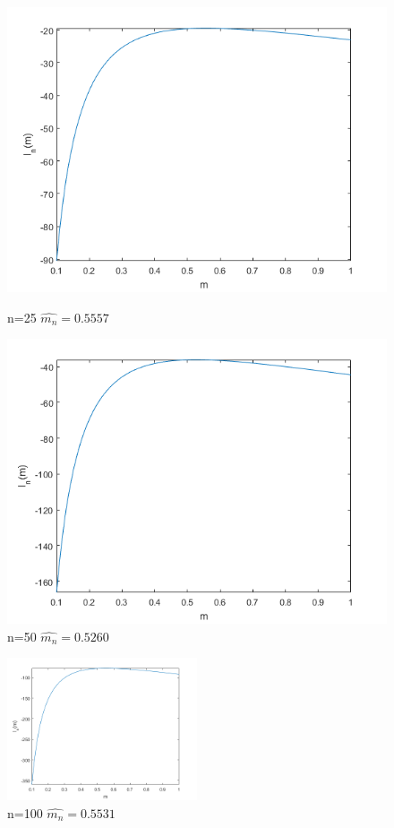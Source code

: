 \documentclass[10pt,a4paper]{report}
\begin{document}
\begin{figure}[ht]
\begin{minipage}[b]{0.5\linewidth}
\centering
\includegraphics[width=\textwidth]{q3n25.png}
\caption{n=25 $\hat{m_n}=0.5557$}
\end{minipage}
\hspace{0.5cm}
\begin{minipage}[b]{0.5\linewidth}
\centering
\includegraphics[width=\textwidth]{q3n50.png}
\caption{n=50 $\hat{m_n}=0.5260$}
\end{minipage}
\end{figure}


\begin{figure}[ht]
\centering
\includegraphics[width=0.5\textwidth]{q3n100.png}
\caption{n=100 $\hat{m_n}=0.5531$}
\end{figure}
\end{document}
